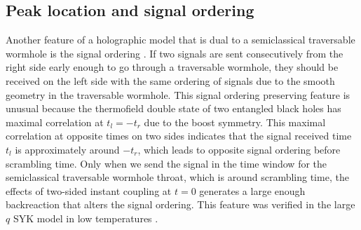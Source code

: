 \documentclass[11pt]{article}
\renewcommand{\>}{\rangle}
\newcommand{\<}{\langle}
\begin{document}
\subsection{Peak location and signal ordering}

Another feature of a holographic model that is dual to a semiclassical
traversable wormhole is the signal ordering \cite{Gao:2019nyj}. If two signals
are sent consecutively from the right side early enough to go through
a traversable wormhole, they should be received on the left side with
the same ordering of signals due to the smooth geometry in the traversable
wormhole. This signal ordering preserving feature is unusual because
the thermofield double state of two entangled black holes has maximal
correlation at $t_{l}=-t_{r}$ due to the boost symmetry. This maximal
correlation at opposite times on two sides indicates that the signal
received time $t_{l}$ is approximately around $-t_{r}$, which leads
to opposite signal ordering before scrambling time. Only when we send
the signal in the time window for the semiclassical traversable wormhole
throat, which is around scrambling time, the effects of two-sided
instant coupling at $t=0$ generates a large enough backreaction that
alters the signal ordering. This feature was verified in the large
$q$ SYK model in low temperatures \cite{Gao:2019nyj}. 
\end{document}
